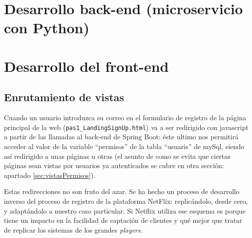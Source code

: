 \documentclass[a4paper,12pt]{report}
\begin{document}
			
			
			
			

			
	\section{Desarrollo back-end (microservicio con Python)}
	
	
	
	
	
	\section{Desarrollo del front-end}
	
	\subsection{Enrutamiento de vistas}
	\label{sec:EnrutamientoDeVistas}
	
	Cuando un usuario introduzca su correo en el formulario de registro de la página principal de la web (\texttt{pas1\_LandingSignUp.html}) va a ser redirigido con javascript a partir de las llamadas al back-end de Spring Boot: éste ultimo nos permitirá acceder al valor de la variable ``permisos'' de la tabla ``usuaris'' de mySql, siendo así redirigido a unas páginas u otras (el asunto de como se evita que ciertas páginas sean vistas por usuarios ya autenticados se cubre en otra sección: apartado \ref{sec:vistasPermisos}).
	
	

	
	Estas redirecciones no son fruto del azar. Se ha hecho un proceso de desarrollo inverso del proceso de registro de la plataforma NetFlix: replicándolo, desde cero, y adaptándolo a nuestro caso particular. Si Netflix utiliza ese esquema es porque tiene un impacto en la facilidad de captación de clientes y qué mejor que tratar de replicar los sistemas de los grandes \textit{players}.
	
\end{document}

